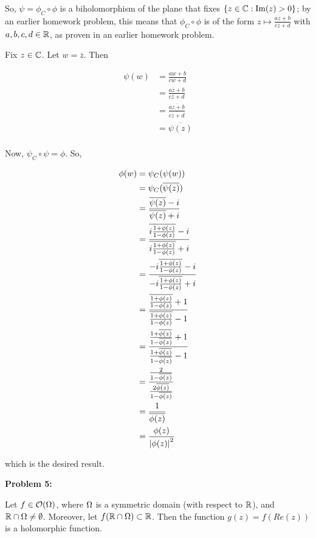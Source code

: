 \documentclass[a4paper,12pt]{article}
\begin{document}
So, $\psi = \phi_C \circ \phi$ is a biholomorphism of the plane that fixes $\{z\in \mathbb{C}:\text{Im}(z)>0\}$; by an earlier homework problem, this means that $\phi_C \circ \phi$ is of the form $z \mapsto \frac{az+b}{cz+d}$ with $a,b,c,d \in \mathbb{R}$, as proven in an earlier homework problem.

Fix $z \in \mathbb{C}$. Let $w = \overline{z}$. Then

\begin{align*}
\psi(w) &= \frac{aw+b}{cw+d}\\
&= \frac{a\overline{z}+b}{c\overline{z}+d}\\
&= \frac{\overline{az+b}}{\overline{cz+d}}\\
&= \overline{\psi(z)}\\
\end{align*}

Now, $\psi_C \circ \psi = \phi$. So,

\begin{align*}
\phi(w) &= \psi_C(\psi(w))\\
&= \psi_C(\overline{\psi(z)})\\
&= \frac{\overline{\psi(z)}-i}{\overline{\psi(z)}+i}\\
&= \frac{\overline{i\frac{1+\phi(z)}{1-\phi(z)}}-i}{\overline{i\frac{1+\phi(z)}{1-\phi(z)}}+i}\\
&= \frac{-i\overline{\frac{1+\phi(z)}{1-\phi(z)}}-i}{-i\overline{\frac{1+\phi(z)}{1-\phi(z)}}+i}\\
&= \frac{\overline{\frac{1+\phi(z)}{1-\phi(z)}}+1}{\overline{\frac{1+\phi(z)}{1-\phi(z)}}-1}\\
&= \frac{\frac{1+\overline{\phi(z)}}{1-\overline{\phi(z)}}+1}{\frac{1+\overline{\phi(z)}}{1-\overline{\phi(z)}}-1}\\
&= \frac{\frac{2}{1-\overline{\phi(z)}}}{\frac{2\overline{\phi(z)}}{1-\overline{\phi(z)}}}\\
&=\frac{1}{\overline{\phi(z)}}\\
&=\frac{\phi(z)}{\left\lvert \phi(z) \right\rvert^2}\\
\end{align*}

which is the desired result.

\shunt

{\bf Problem 5:}

Let $f \in \mathcal{O}(\Omega)$, where $\Omega$ is a symmetric domain (with respect to $\mathbb{R}$), and $\mathbb{R} \cap \Omega \neq \emptyset$. Moreover, let $f(\mathbb{R} \cap \Omega) \subset \mathbb{R}$. Then the function $g(z)=f(Re(z))$ is a holomorphic function. %
\end{document}
